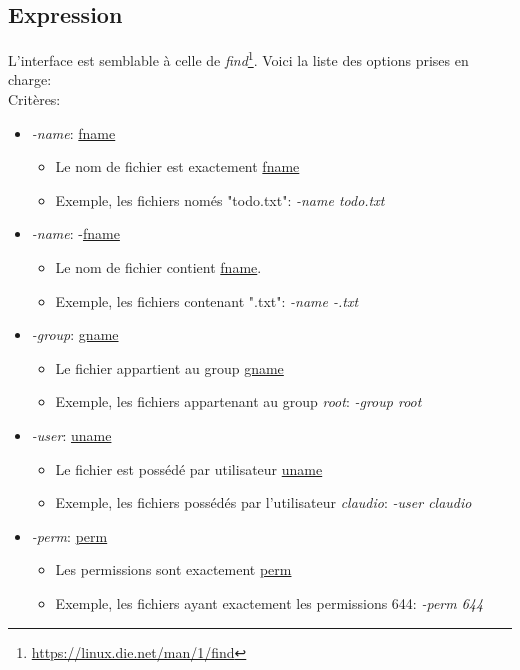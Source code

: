 \documentclass[11pt, a4paper]{article}
\begin{document}
\subsection{Expression}
\label{ann_exp}
L'interface est semblable à celle de \textit{find}\footnote{\url{https://linux.die.net/man/1/find}}.
Voici la liste des options prises en charge:\\

Critères:
\begin{itemize}
	\renewcommand\labelitemi{}
	\renewcommand\labelitemii{}
	\renewcommand\labelitemiii{}
	\item \textit{-name}: \underline{fname}
	\begin{itemize}
		\item Le nom de fichier est exactement \underline{fname}
		\item Exemple, les fichiers només  "todo.txt": \textit{-name todo.txt}
	\end{itemize}
	\item \textit{-name}: -\underline{fname}
	\begin{itemize}
		\item     Le nom de fichier contient \underline{fname}.
		\item     Exemple, les fichiers contenant ".txt":
		\textit{-name -.txt}
	\end{itemize}
	\item \textit{-group}: \underline{gname}
	\begin{itemize}
		\item 	   	Le fichier appartient au group \underline{gname}
		\item 	   	Exemple, les fichiers appartenant au group \textit{root}: \textit{-group root}
	\end{itemize}
	\item \textit{-user}: \underline{uname}
	\begin{itemize}
		\item 		Le fichier est possédé par utilisateur \underline{uname}
		\item 	   	Exemple, les fichiers possédés par l'utilisateur \textit{claudio}: \textit{-user claudio}
	\end{itemize}
	\item \textit{-perm}: \underline{perm}
	\begin{itemize}
		\item 		Les permissions sont exactement \underline{perm}
		\item 		Exemple, les fichiers ayant exactement les permissions 644: \textit{-perm 644}

\end{itemize}
\end{itemize}
\end{document}
